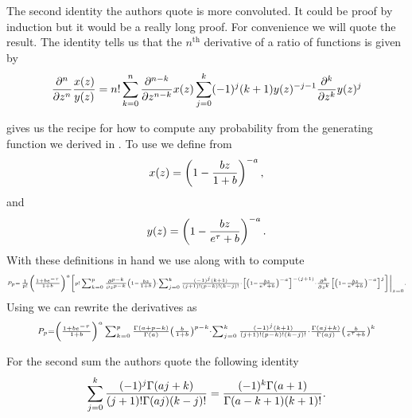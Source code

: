 The second identity the authors quote is more convoluted. It could be proof by
induction but it would be a really long proof. For convenience we will quote
the result. The identity tells us that the $n^{\text{th}}$ derivative of a ratio
of functions is given by
\begin{equation}
  {\partial ^n \over \partial z^n} {x(z) \over y(z)} =
  n! \sum_{k=0}^n {\partial ^{n-k} \over \partial z^{n-k}} x(z)
  \sum_{j = 0}^k (-1)^j (k + 1) y(z)^{-j-1}
  {\partial^k \over \partial z^k} y(z)^j
  \label{eq_derivative_ratio}
\end{equation}

 gives us the recipe for how to compute any
probability from the generating function we derived in
. To use  we define from
\begin{equation}
  x(z) = \left( 1 - {b z \over 1 + b} \right)^{-a},
\end{equation}
and
\begin{equation}
  y(z) = \left( 1 - {b z \over e^{\tau} + b} \right)^{-a}.
\end{equation}
With these definitions in hand we use  along with
 to compute
\begin{equation}
  \scriptscriptstyle
  P_p = \left. {1 \over p!} \left( {1 + b e^{-\tau} \over 1 + b} \right)^a
  \left[ p! \sum_{k=0}^p  {\partial^{p-k} \over \partial z^{p-k}}
  \left(1 - {b z \over 1 + b} \right) \cdot
  \sum_{j=0}^k {(-1)^j (k + 1) \over (j + 1)! (p - k)! (k - j)!} \cdot
  \left[ \left( 1 - {b z \over e^\tau + b} \right)^{-a} \right]^{-(j+1)} \cdot
  {\partial^k \over \partial z^k}
  \left[ \left( 1 - {b z \over e^\tau + b}  \right)^{-a} \right]^j
  \right]\right\vert _{z=0}.
\end{equation}
Using  we can rewrite the derivatives as
\begin{equation}
  \scriptstyle
  P_p = \left( {1 + b e^{-\tau} \over 1 + b} \right)^a
  \sum_{k=0}^p {\Gamma(a + p - k) \over \Gamma(a)}
  \left( {b \over 1 + b} \right)^{p - k} \cdot
  \sum_{j=0}^k {(-1)^j (k + 1) \over (j + 1)! (p - k)! (k - j)!} \cdot
  {\Gamma(aj + k) \over \Gamma(aj)} \left( {b \over e^\tau + b} \right)^k
\end{equation}

For the second sum the authors quote the following identity
\begin{equation}
  \sum_{j=0}^k {(-1)^j \Gamma(aj + k) \over (j + 1)! \Gamma(aj) (k - j)!} =
  {(-1)^k \Gamma(a + 1) \over \Gamma(a - k + 1) (k + 1)!}.
\end{equation}

